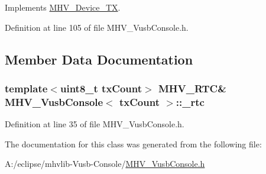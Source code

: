 Implements \hyperlink{class_m_h_v___device___t_x_a3a86067d417c3d5a1f64042ecfcefff7}{M\-H\-V\-\_\-\-Device\-\_\-\-T\-X}.



Definition at line 105 of file M\-H\-V\-\_\-\-Vusb\-Console.\-h.



\subsection{Member Data Documentation}
\hypertarget{class_m_h_v___vusb_console_a0ae20702047c702e8bf950753874dff6}{
\subsubsection[{\-\_\-rtc}]{\setlength{\rightskip}{0pt plus 5cm}template$<$uint8\-\_\-t tx\-Count$>$ {\bf M\-H\-V\-\_\-\-R\-T\-C}\& {\bf M\-H\-V\-\_\-\-Vusb\-Console}$<$ tx\-Count $>$\-::\-\_\-rtc\hspace{0.3cm}{\ttfamily [protected]}}}\label{class_m_h_v___vusb_console_a0ae20702047c702e8bf950753874dff6}


Definition at line 35 of file M\-H\-V\-\_\-\-Vusb\-Console.\-h.



The documentation for this class was generated from the following file\-:\begin{DoxyCompactItemize}
\item 
A\-:/eclipse/mhvlib-\/\-Vusb-\/\-Console/\hyperlink{_m_h_v___vusb_console_8h}{M\-H\-V\-\_\-\-Vusb\-Console.\-h}\end{DoxyCompactItemize}
